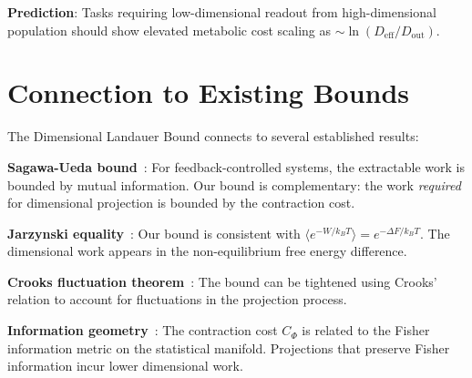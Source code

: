 \documentclass[aps,prx,twocolumn,superscriptaddress,floatfix]{revtex4-2}
\begin{document}
\textbf{Prediction}: Tasks requiring low-dimensional readout from high-dimensional population should show elevated metabolic cost scaling as $\sim \ln(D_\mathrm{eff}/D_\mathrm{out})$.

\section{Connection to Existing Bounds}
\label{app:connections}

The Dimensional Landauer Bound connects to several established results:

\textbf{Sagawa-Ueda bound}~\cite{sagawa2010}: For feedback-controlled systems, the extractable work is bounded by mutual information. Our bound is complementary: the work \emph{required} for dimensional projection is bounded by the contraction cost.

\textbf{Jarzynski equality}~\cite{jarzynski1997}: Our bound is consistent with $\langle e^{-W/k_B T}\rangle = e^{-\Delta F/k_B T}$. The dimensional work appears in the non-equilibrium free energy difference.

\textbf{Crooks fluctuation theorem}~\cite{crooks1999}: The bound can be tightened using Crooks' relation to account for fluctuations in the projection process.

\textbf{Information geometry}~\cite{amari2016}: The contraction cost $C_\Phi$ is related to the Fisher information metric on the statistical manifold. Projections that preserve Fisher information incur lower dimensional work.


\end{document}
